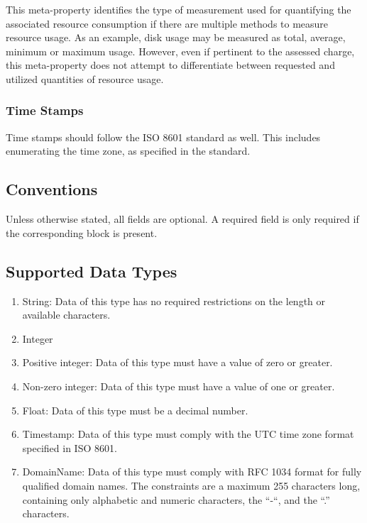 This meta-property identifies the type of measurement used for quantifying the associated resource consumption if there are multiple methods to measure resource usage. As an example, disk usage may be measured as total, average, minimum or maximum usage. However, even if pertinent to the assessed charge, this meta-property does not attempt to differentiate between requested and utilized quantities of resource usage.






\subsubsection{Time Stamps}

Time stamps should follow the ISO 8601\cite{wolf1998date} standard as well. This includes enumerating the time zone, as specified in the standard.






\subsection{Conventions}

Unless otherwise stated, all fields are optional. A required field is only required if the corresponding block is present.






\subsection{Supported Data Types}

\begin{enumerate}
\item String: Data of this type has no required restrictions on the length or available characters.
\item Integer
\item Positive integer: Data of this type must have a value of zero or greater.
\item Non-zero integer: Data of this type must have a value of one or greater.
\item Float: Data of this type must be a decimal number.
\item Timestamp: Data of this type must comply with the UTC time zone format specified in ISO 8601.
\item DomainName: Data of this type must comply with RFC 1034\cite{mockapetrisrfc} format for fully qualified domain names.  The constraints are a maximum 255 characters long, containing only alphabetic and numeric characters, the “-“,  and the “.” characters.
\end{enumerate}


